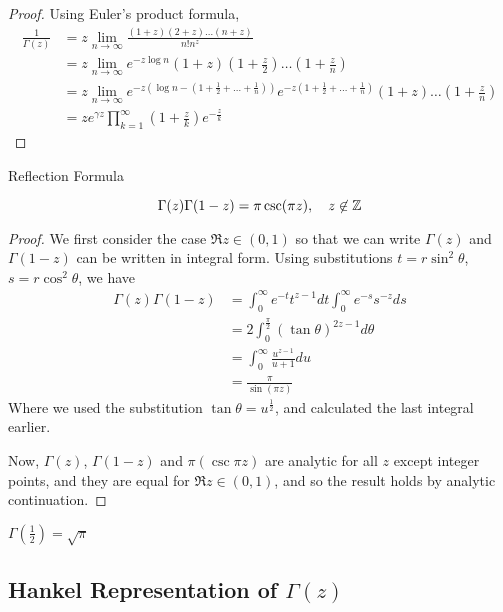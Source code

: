 \documentclass[a4paper]{article}
\begin{document}
\begin{proof}
	Using Euler's product formula,
	\begin{align*}
		\frac{1}{\Gamma(z) } &= z \lim_{n\to \infty} \frac{(1+z)(2+z)\ldots(n+z)}{n! n^{z}} \\
		&= z \lim_{n\to \infty} e^{-z \log n} \left(1+z\right)\left(1+\frac{z}{2}\right)\ldots\left(1+\frac{z}{n}\right) \\
		&= z \lim_{n\to \infty} e^{-z\left( \log n - (1 + \frac{1}{2} + \ldots + \frac{1}{n}) \right) }e^{-z\left( 1+\frac{1}{2} + \ldots + \frac{1}{n} \right) } \left(1+z\right)\ldots\left(1+\frac{z}{n}\right)  \\
		&= z e^{\gamma z} \prod_{k=1}^{\infty} \left( 1+ \frac{z}{k} \right) e^{-\frac{z}{k}}
	\end{align*} 
\end{proof}

\begin{prop} Reflection Formula
	
	\[
		\Gamma(z)\Gamma(1-z) = \pi \csc (\pi z), \quad z \not\in \mathbb{Z}
	\]
\end{prop}

\begin{proof}
	We first consider the case  $\Re z \in (0,1)$ so that we can write $\Gamma(z)$ and $\Gamma(1-z)$ can be written in integral form. Using substitutions $t = r \sin^2\theta$, $s = r \cos^2\theta$, we have 
	\begin{align*}
		\Gamma(z) \Gamma(1-z) &= \int_0^{\infty} e^{-t} t^{z-1} dt \int_0^{\infty} e^{-s} s^{-z} ds \\
				      &= 2 \int_0^{\frac{\pi}{2}} (\tan \theta )^{2z-1} d\theta \\
				      &= \int_{0}^{\infty} \frac{u^{z-1}}{u+1} du \\
				      &= \frac{\pi}{\sin (\pi z)}
	\end{align*}
	Where we used the substitution $\tan \theta = u^{\frac{1}{2}}$, and calculated the last integral earlier.

	Now, $\Gamma(z)$, $\Gamma(1-z)$ and $\pi (\csc \pi z)$ are analytic for all $ z$ except integer points, and they are equal for $\Re z \in (0,1)$, and so the result holds by analytic continuation.
\end{proof}

\begin{corollary}
	$\Gamma(\frac{1}{2}) = \sqrt{\pi} $
\end{corollary}

\subsection{Hankel Representation of $\Gamma(z)$ }
\end{document}
